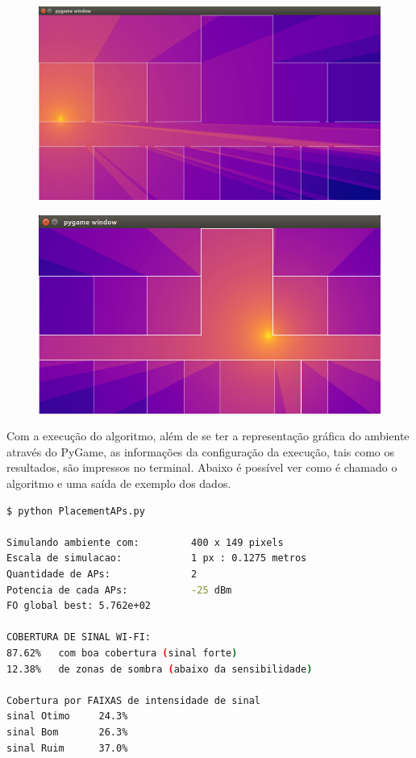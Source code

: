 \documentclass[
	12pt,				%
	openright,			%
	twoside,			%
	a4paper,			%
	english,			%
	french,				%
	spanish,			%
	brazil				%
	]{abntex2}
\begin{document}
\begin{figure}[htb]
\begin{minipage}{0.4\textwidth}
		\centering \label{captura_3}
		\includegraphics[scale=0.2]{images/captura-3.jpg}
	\end{minipage}
	\hfill
	\begin{minipage}{0.4\textwidth}
		\centering \label{captura_4}
		\includegraphics[scale=0.3]{images/captura-4.jpg}
	\end{minipage}

\end{figure}

Com a execução do algoritmo, além de se ter a representação gráfica do ambiente através do PyGame, as informações da configuração da execução, tais como os resultados, são impressos no terminal. Abaixo é possível ver como é chamado o algoritmo e uma saída de exemplo dos dados.

\begin{lstlisting}[language=bash]
$ python PlacementAPs.py 

Simulando ambiente com:  		400 x 149 pixels
Escala de simulacao:     		1 px : 0.1275 metros
Quantidade de APs:       		2
Potencia de cada APs:    		-25 dBm
FO global best: 5.762e+02

COBERTURA DE SINAL WI-FI:
87.62%	 com boa cobertura (sinal forte)
12.38%	 de zonas de sombra (abaixo da sensibilidade)

Cobertura por FAIXAS de intensidade de sinal
sinal Otimo  	24.3%
sinal Bom    	26.3%
sinal Ruim   	37.0%

\end{lstlisting}
	
\end{document}
